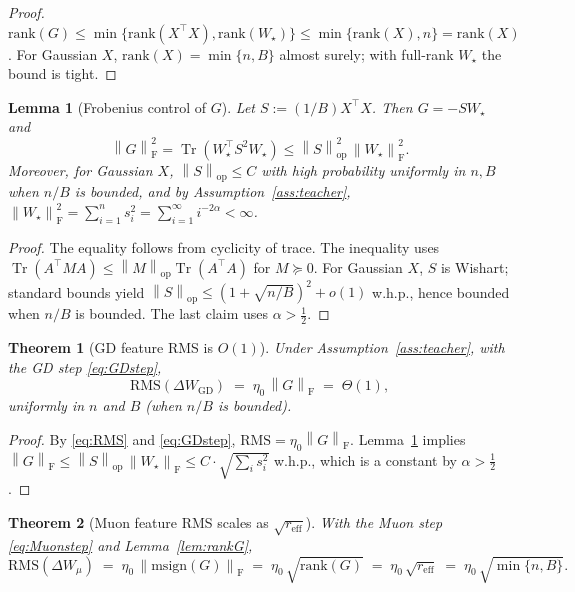 \documentclass[11pt]{article}
\newtheorem{theorem}{Theorem}
\newtheorem{lemma}{Lemma}
\theoremstyle{definition}
\DeclareMathOperator{\Tr}{Tr}
\newcommand{\op}{\mathrm{op}}
\newcommand{\fro}{\mathrm{F}}
\newcommand{\msgn}{\mathrm{msign}}
\newcommand{\norm}[1]{\left\lVert#1\right\rVert}
\begin{document}
\begin{proof}
$\mathrm{rank}(G)\le \min\{\mathrm{rank}(X^\top X),\mathrm{rank}(W_\star)\} \le \min\{\mathrm{rank}(X),n\}=\mathrm{rank}(X)$. For Gaussian $X$, $\mathrm{rank}(X)=\min\{n,B\}$ almost surely; with full-rank $W_\star$ the bound is tight.
\end{proof}

\begin{lemma}[Frobenius control of $G$]\label{lem:GFbound}
Let $S:=(1/B)X^\top X$. Then $G=-S W_\star$ and
\[
\norm{G}_\fro^2 = \Tr(W_\star^\top S^2 W_\star)\le \norm{S}_\op^2\, \norm{W_\star}_\fro^2.
\]
Moreover, for Gaussian $X$, $\norm{S}_\op \le C$ with high probability uniformly in $n,B$ when $n/B$ is bounded, and by Assumption~\ref{ass:teacher}, $\norm{W_\star}_\fro^2=\sum_{i=1}^n s_i^2=\sum_{i=1}^\infty i^{-2\alpha}<\infty$.
\end{lemma}

\begin{proof}
The equality follows from cyclicity of trace. The inequality uses $\Tr(A^\top M A)\le \norm{M}_\op \Tr(A^\top A)$ for $M\succeq 0$. For Gaussian $X$, $S$ is Wishart; standard bounds yield $\norm{S}_\op \le (1+\sqrt{n/B})^2+o(1)$ w.h.p., hence bounded when $n/B$ is bounded. The last claim uses $\alpha>\tfrac12$.
\end{proof}

\begin{theorem}[GD feature RMS is $O(1)$]\label{thm:GD}
Under Assumption~\ref{ass:teacher}, with the GD step \eqref{eq:GDstep},
\[
\mathrm{RMS}(\Delta W_{\mathrm{GD}}) \;=\; \eta_0\, \norm{G}_\fro \;=\; \Theta(1),
\]
uniformly in $n$ and $B$ (when $n/B$ is bounded).
\end{theorem}

\begin{proof}
By \eqref{eq:RMS} and \eqref{eq:GDstep}, $\mathrm{RMS}=\eta_0 \norm{G}_\fro$. Lemma~\ref{lem:GFbound} implies $\norm{G}_\fro\le \norm{S}_\op \,\norm{W_\star}_\fro \le C\cdot \sqrt{\sum_i s_i^2}$ w.h.p., which is a constant by $\alpha>\tfrac12$.
\end{proof}

\begin{theorem}[Muon feature RMS scales as $\sqrt{r_{\mathrm{eff}}}$]\label{thm:Muon}
With the Muon step \eqref{eq:Muonstep} and Lemma~\ref{lem:rankG},
\[
\mathrm{RMS}(\Delta W_\mu) \;=\; \eta_0\, \norm{\msgn(G)}_\fro \;=\; \eta_0\, \sqrt{\mathrm{rank}(G)} \;=\; \eta_0\, \sqrt{r_{\mathrm{eff}}}\;=\;\eta_0\, \sqrt{\min\{n,B\}}.
\]
\end{theorem}
\end{document}
